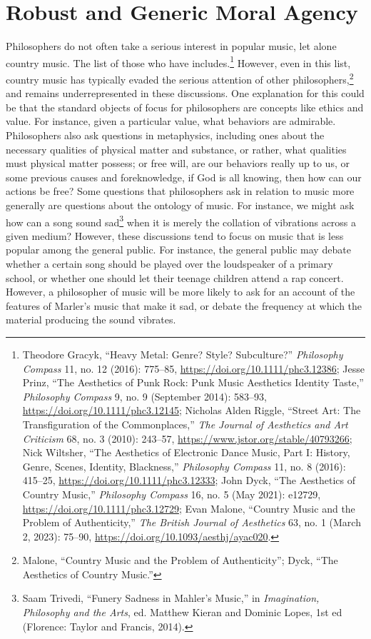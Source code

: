 \documentclass[phdthesis,12pt,final]{wuthesis}
\theoremstyle{definition}
\theoremstyle{definition}
\theoremstyle{definition}
\theoremstyle{definition}
\theoremstyle{remark}
\begin{document}
\chapter{Robust and Generic Moral Agency}\label{robust-and-generic-moral-agency}

Philosophers do not often take a serious interest in popular music, let alone country music. The list of those who have includes.\footnote{Theodore Gracyk, {``Heavy Metal: Genre? {Style}? {Subculture}?''} \emph{Philosophy Compass} 11, no. 12 (2016): 775--85, \url{https://doi.org/10.1111/phc3.12386}; Jesse Prinz, {``The {Aesthetics} of {Punk Rock}: {Punk Music Aesthetics Identity Taste},''} \emph{Philosophy Compass} 9, no. 9 (September 2014): 583--93, \url{https://doi.org/10.1111/phc3.12145}; Nicholas Alden Riggle, {``Street {Art}: {The Transfiguration} of the {Commonplaces},''} \emph{The Journal of Aesthetics and Art Criticism} 68, no. 3 (2010): 243--57, \url{https://www.jstor.org/stable/40793266}; Nick Wiltsher, {``The {Aesthetics} of {Electronic Dance Music}, {Part I}: {History}, {Genre}, {Scenes}, {Identity}, {Blackness},''} \emph{Philosophy Compass} 11, no. 8 (2016): 415--25, \url{https://doi.org/10.1111/phc3.12333}; John Dyck, {``The Aesthetics of Country Music,''} \emph{Philosophy Compass} 16, no. 5 (May 2021): e12729, \url{https://doi.org/10.1111/phc3.12729}; Evan Malone, {``Country {Music} and the {Problem} of {Authenticity},''} \emph{The British Journal of Aesthetics} 63, no. 1 (March 2, 2023): 75--90, \url{https://doi.org/10.1093/aesthj/ayac020}.} However, even in this list, country music has typically evaded the serious attention of other philosophers,\footnote{Malone, {``Country {Music} and the {Problem} of {Authenticity}''}; Dyck, {``The Aesthetics of Country Music.''}} and remains underrepresented in these discussions. One explanation for this could be that the standard objects of focus for philosophers are concepts like ethics and value. For instance, given a particular value, what behaviors are admirable. Philosophers also ask questions in metaphysics, including ones about the necessary qualities of physical matter and substance, or rather, what qualities must physical matter possess; or free will, are our behaviors really up to us, or some previous causes and foreknowledge, if God is all knowing, then how can our actions be free? Some questions that philosophers ask in relation to music more generally are questions about the ontology of music. For instance, we might ask how can a song sound sad\footnote{Saam Trivedi, {``Funery {Sadness} in {Mahler}'s {Music},''} in \emph{Imagination, {Philosophy} and the {Arts}}, ed. Matthew Kieran and Dominic Lopes, 1st ed (Florence: {Taylor and Francis}, 2014).} when it is merely the collation of vibrations across a given medium? However, these discussions tend to focus on music that is less popular among the general public. For instance, the general public may debate whether a certain song should be played over the loudspeaker of a primary school, or whether one should let their teenage children attend a rap concert. However, a philosopher of music will be more likely to ask for an account of the features of Marler's music that make it sad, or debate the frequency at which the material producing the sound vibrates. 
\end{document}
